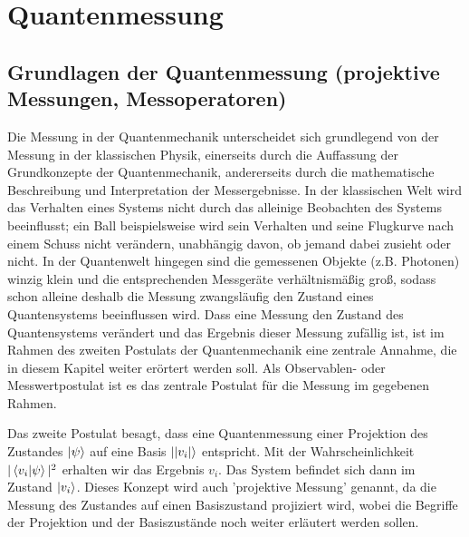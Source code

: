 \section{Quantenmessung }
\subsection{Grundlagen der Quantenmessung (projektive Messungen, Messoperatoren)}

Die Messung in der Quantenmechanik unterscheidet sich grundlegend von der Messung in der klassischen Physik, einerseits durch die Auffassung der Grundkonzepte der Quantenmechanik, andererseits durch die mathematische Beschreibung und Interpretation der Messergebnisse.
In der klassischen Welt wird das Verhalten eines Systems nicht durch das alleinige Beobachten des Systems beeinflusst; ein Ball beispielsweise wird sein Verhalten und seine Flugkurve nach einem Schuss nicht verändern, unabhängig davon, ob jemand dabei zusieht oder nicht.
In der Quantenwelt hingegen sind die gemessenen Objekte (z.B. Photonen) winzig klein und die entsprechenden Messgeräte verhältnismäßig groß, sodass schon alleine deshalb die Messung zwangsläufig den Zustand eines Quantensystems beeinflussen wird. 
Dass eine Messung den Zustand des Quantensystems verändert und das Ergebnis dieser Messung zufällig ist, ist im Rahmen des zweiten Postulats der Quantenmechanik eine zentrale Annahme, die in diesem Kapitel weiter erörtert werden soll. Als Observablen- oder Messwertpostulat ist es das zentrale Postulat für die Messung im gegebenen Rahmen.

Das zweite Postulat besagt, dass eine Quantenmessung einer Projektion des Zustandes $\ket{\psi}$ auf eine Basis $\ket{|v_i|}$ entspricht. Mit der Wahrscheinlichkeit $|\braket{v_i|\psi}|^2$ erhalten wir das Ergebnis $v_i$. Das System befindet sich dann im Zustand $\ket{v_i}$. \cite{lvovsky_quantum_2018} 
\newline Dieses Konzept wird auch 'projektive Messung' genannt, da die Messung des Zustandes auf einen Basiszustand projiziert wird, wobei die Begriffe der Projektion und der Basiszustände noch weiter erläutert werden sollen. \\
\\

